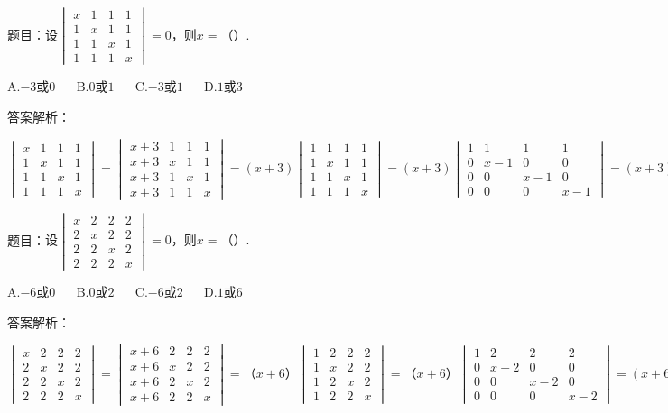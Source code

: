 题目：$设\begin{vmatrix}x&1&1&1\\1&x&1&1\\1&1&x&1\\1&1&1&x\end{vmatrix}=0，则x=（）.$

A.$-3或0$ $\quad$ B.$0或1$ $\quad$ C.$-3或1$ $\quad$ D.$1或3$

答案解析：

$\begin{vmatrix}x&1&1&1\\1&x&1&1\\1&1&x&1\\1&1&1&x\end{vmatrix}=\begin{vmatrix}x+3&1&1&1\\x+3&x&1&1\\x+3&1&x&1\\x+3&1&1&x\end{vmatrix}=\left(x+3\right)\begin{vmatrix}1&1&1&1\\1&x&1&1\\1&1&x&1\\1&1&1&x\end{vmatrix}=\left(x+3\right)\begin{vmatrix}1&1&1&1\\0&x-1&0&0\\0&0&x-1&0\\0&0&0&x-1\end{vmatrix}=\left(x+3\right)\left(x-1\right)^3=0.$



题目：$设\begin{vmatrix}x&2&2&2\\2&x&2&2\\2&2&x&2\\2&2&2&x\end{vmatrix}=0，则x=（）.$

A.$-6或0$ $\quad$ B.$0或2$ $\quad$ C.$-6或2$ $\quad$ D.$1或6$

答案解析：

$\begin{vmatrix}x&2&2&2\\2&x&2&2\\2&2&x&2\\2&2&2&x\end{vmatrix}=\begin{vmatrix}x+6&2&2&2\\x+6&x&2&2\\x+6&2&x&2\\x+6&2&2&x\end{vmatrix}=（x+6）\begin{vmatrix}1&2&2&2\\1&x&2&2\\1&2&x&2\\1&2&2&x\end{vmatrix}=（x+6）\begin{vmatrix}1&2&2&2\\0&x-2&0&0\\0&0&x-2&0\\0&0&0&x-2\end{vmatrix}=\left(x+6\right)\left(x-2\right)^3=0.$




